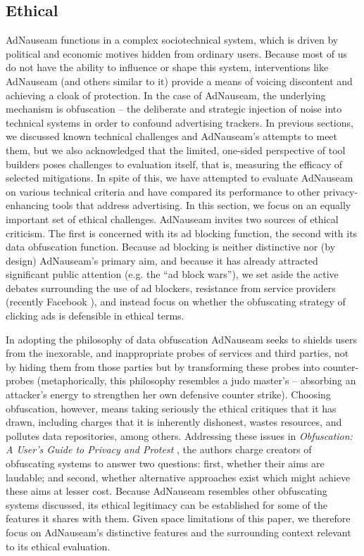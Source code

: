 \documentclass[conference]{IEEEtran}
\begin{document}
\subsection{Ethical}
AdNauseam functions in a complex sociotechnical system, which is driven by political and economic motives hidden from ordinary users. Because most of us do not have the ability to influence or shape this system, interventions like AdNauseam (and others similar to it) provide a means of voicing discontent and achieving a cloak of protection. In the case of AdNauseam, the underlying mechanism is obfuscation -- the deliberate and strategic injection of noise into technical systems in order to confound advertising trackers. In previous sections, we discussed known technical challenges and AdNauseam's attempts to meet them, but we also acknowledged that the limited, one-sided perspective of tool builders poses challenges to evaluation itself, that is, measuring the efficacy of selected mitigations. In spite of this, we have attempted to evaluate AdNauseam on various technical criteria and have compared its performance to other privacy-enhancing tools that address advertising. In this section, we focus on an equally important set of ethical challenges. AdNauseam invites two sources of ethical criticism. The first is concerned with its ad blocking function, the second with its data obfuscation function. Because ad blocking is neither distinctive nor (by design) AdNauseam's primary aim, and because it has already attracted significant public attention (e.g. the “ad block wars”), we set aside the active debates surrounding the use of ad blockers, resistance from service providers (recently Facebook \cite{Johnston}), and instead focus on whether the obfuscating strategy of clicking ads is defensible in ethical terms.

In adopting the philosophy of data obfuscation AdNauseam seeks to shields users from the inexorable, and inappropriate probes of services and third parties, not by hiding them from those parties but by transforming these probes into counter-probes (metaphorically, this philosophy resembles a judo master's -- absorbing an attacker's energy to strengthen her own defensive counter strike). Choosing obfuscation, however, means taking seriously the ethical critiques that it has drawn, including charges that it is inherently dishonest, wastes resources, and pollutes data repositories, among others. Addressing these issues in \emph{Obfuscation: A User's Guide to Privacy and Protest} \cite{Brunton}, the authors charge creators of obfuscating systems to answer two questions: first, whether their aims are laudable; and second, whether alternative approaches exist which might achieve these aims at lesser cost. Because AdNauseam resembles other obfuscating systems discussed, its ethical legitimacy can be established for some of the features it shares with them. Given space limitations of this paper, we therefore focus on AdNauseam's distinctive features and the surrounding context relevant to its ethical evaluation.
\end{document}
